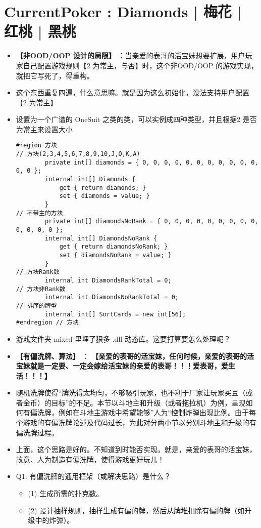 \documentclass[9pt, b5paper]{article}
\begin{document}
\section{CurrentPoker : Diamonds | 梅花 | 红桃 | 黑桃}
\label{sec-2}
\begin{itemize}
\item \textbf{【非OOD/OOP 设计的局限】} ：当亲爱的表哥的活宝妹想要扩展，用户玩家自己配置游戏规则【2 为常主，与否】时，这个非OOD/OOP 的游戏实现，就把它写死了，得重构。
\item 这个东西重复四遍，什么意思嘛。就是因为这么初始化，没法支持用户配置【2 为常主】
\item 设置为一个广谱的 OneSuit 之类的类，可以实例成四种类型，并且根据2 是否为常主来设置大小
\begin{verbatim}
#region 方块
// 方块(2,3,4,5,6,7,8,9,10,J,Q,K,A)
        private int[] diamonds = { 0, 0, 0, 0, 0, 0, 0, 0, 0, 0, 0, 0, 0 };
        internal int[] Diamonds {
            get { return diamonds; }
            set { diamonds = value; }
        }
// 不带主的方块
        private int[] diamondsNoRank = { 0, 0, 0, 0, 0, 0, 0, 0, 0, 0, 0, 0, 0 };
        internal int[] DiamondsNoRank {
            get { return diamondsNoRank; }
            set { diamondsNoRank = value; }
        }
// 方块Rank数
        internal int DiamondsRankTotal = 0;
// 方块非Rank数
        internal int DiamondsNoRankTotal = 0;
// 排序的牌型
        internal int[] SortCards = new int[56];
#endregion // 方块
\end{verbatim}
\item 游戏文件夹 mixed 里埋了狠多 .dll 动态库。这要打算要怎么处理呢？
\item \textbf{【有偏洗牌、算法】} ： \textbf{【亲爱的表哥的活宝妹，任何时候，亲爱的表哥的活宝妹就是一定要、一定会嫁给活宝妹的亲爱的表哥！！！爱表哥，爱生活！！！】}
\item 随机洗牌使得“牌洗得太均匀，不够吸引玩家，也不利于厂家让玩家买豆（或者金币）的目标”的不足。本节以斗地主和升级（或者拖拉机）为例，呈现如何有偏洗牌，例如在斗地主游戏中希望能够”人为“控制炸弹出现比例。由于每个游戏的有偏洗牌论述及代码过长，为此对分两小节以分别斗地主和升级的有偏洗牌过程。
\item 上面，这个思路是好的。不知道到时能否实现。就是，亲爱的表哥的活宝妹，故意、人为制造有偏洗牌，使得游戏更好玩儿！
\item Q1: 有偏洗牌的通用框架（或解决思路）是什么？
\begin{itemize}
\item (1) 生成所需的扑克数。
\item (2) 设计抽样规则，抽样生成有偏的牌，然后从牌堆扣除有偏的牌（如升级中的炸弹）。

\end{itemize}
\end{itemize}
\end{document}
